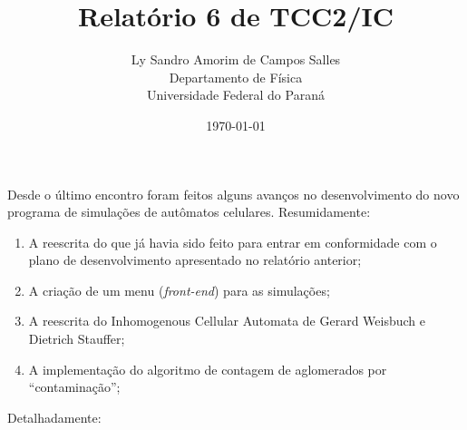 \documentclass[12pt,a4paper,final]{article}
\title{Relatório 6 de TCC2/IC}
\author{Ly Sandro Amorim de Campos Salles\\Departamento de Física\\Universidade Federal do Paraná}
\date{\today}
\begin{document}
	\maketitle

  Desde o último encontro foram feitos alguns avanços no desenvolvimento do novo programa de simulações de autômatos celulares. Resumidamente:
  \begin{enumerate}
    \item A reescrita do que já havia sido feito para entrar em conformidade com o plano de desenvolvimento apresentado no relatório anterior;
    \item A criação de um menu (\textit{front-end}) para as simulações;
    \item A reescrita do Inhomogenous Cellular Automata de Gerard Weisbuch e Dietrich Stauffer;
    \item A implementação do algoritmo de contagem de aglomerados por ``contaminação'';
  \end{enumerate}
  Detalhadamente:\\
\end{document}
